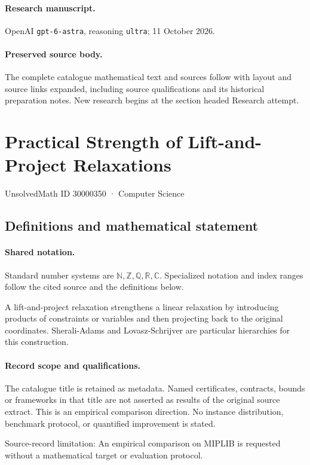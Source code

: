 \documentclass[11pt]{article}
\begin{document}
\paragraph{Research manuscript.} OpenAI \texttt{gpt-6-astra}, reasoning \texttt{ultra}; 11 October 2026.
\paragraph{Preserved source body.} The complete catalogue mathematical text and sources follow with layout and source links expanded, including source qualifications and its historical preparation notes. New research begins at the section headed Research attempt.

\section{Practical Strength of Lift-and-Project Relaxations}\label{30000350}
{\small UnsolvedMath ID 30000350 · Computer Science}
\subsection{Definitions and mathematical statement}

\paragraph{Shared notation.}Standard number systems are $\mathbb N,\mathbb Z,\mathbb Q,\mathbb R,\mathbb C$. Specialized notation and index ranges follow the cited source and the definitions below.


A lift-and-project relaxation strengthens a linear relaxation by introducing products of constraints or variables and then projecting back to the original coordinates. Sherali-Adams and Lovasz-Schrijver are particular hierarchies for this construction.
\paragraph{Record scope and qualifications.}
The catalogue title is retained as metadata. Named certificates, contracts, bounds or frameworks in that title are not asserted as results of the original source extract.
This is an empirical comparison direction. No instance distribution, benchmark protocol, or quantified improvement is stated.

Source-record limitation: An empirical comparison on MIPLIB is requested without a mathematical target or evaluation protocol.
\end{document}
